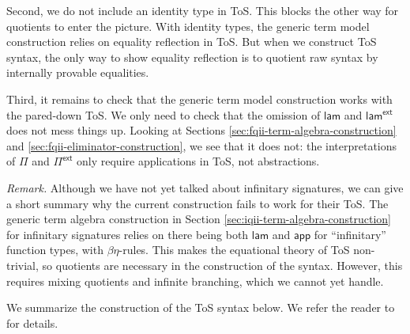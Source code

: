 \documentclass[12pt,a4paper,twoside,openany]{book}
\theoremstyle{remark}
\theoremstyle{definition}
\theoremstyle{theorem}
\newcommand{\ms}[1]{\mathsf{#1}}
\newcommand{\Pie}{\Pi^{\mathsf{ext}}}
\newcommand{\lame}{\mathsf{lam^{ext}}}
\newcommand{\app}{\ms{app}}
\newcommand{\lam}{\ms{lam}}
\begin{document}
Second, we do not include an identity type in ToS. This blocks the other way for
quotients to enter the picture. With identity types, the generic term model
construction relies on equality reflection in ToS. But when we construct ToS
syntax, the only way to show equality reflection is to quotient raw syntax by
internally provable equalities.

Third, it remains to check that the generic term model construction works with
the pared-down ToS. We only need to check that the omission of $\lam$ and
$\lame$ does not mess things up. Looking at Sections
\ref{sec:fqii-term-algebra-construction} and
\ref{sec:fqii-eliminator-construction}, we see that it does not: the
interpretations of $\Pi$ and $\Pie$ only require applications in ToS, not
abstractions.

\emph{Remark.} Although we have not yet talked about infinitary signatures, we
can give a short summary why the current construction fails to work for their
ToS.  The generic term algebra construction in Section
\ref{sec:iqii-term-algebra-construction} for infinitary signatures relies on
there being both $\lam$ and $\app$ for ``infinitary'' function types, with
$\beta\eta$-rules. This makes the equational theory of ToS non-trivial, so
quotients are necessary in the construction of the syntax. However, this
requires mixing quotients and infinite branching, which we cannot yet handle.

We summarize the construction of the ToS syntax below. We refer the reader to
\cite{ind-ind-reduction} for details.
\end{document}
